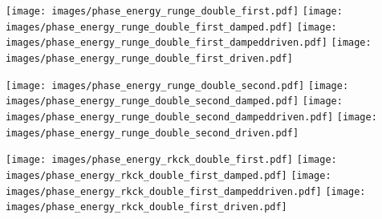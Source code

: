 \begin{multicols}{4}

{\centering\texttt{[image: images/phase\_energy\_runge\_double\_first.pdf]}}
\label{fig:64}
\hfill
{\centering\texttt{[image: images/phase\_energy\_runge\_double\_first\_damped.pdf]}}
\label{fig:65}
\hfill
{\centering\texttt{[image: images/phase\_energy\_runge\_double\_first\_dampeddriven.pdf]}}
\label{fig:66}
\hfill
{\centering\texttt{[image: images/phase\_energy\_runge\_double\_first\_driven.pdf]}}
\label{fig:67}
\hfill

\end{multicols}
\begin{multicols}{4}

{\centering\texttt{[image: images/phase\_energy\_runge\_double\_second.pdf]}}
\label{fig:68}
\hfill
{\centering\texttt{[image: images/phase\_energy\_runge\_double\_second\_damped.pdf]}}
\label{fig:69}
\hfill
{\centering\texttt{[image: images/phase\_energy\_runge\_double\_second\_dampeddriven.pdf]}}
\label{fig:70}
\hfill
{\centering\texttt{[image: images/phase\_energy\_runge\_double\_second\_driven.pdf]}}
\label{fig:71}
\hfill

\end{multicols}
\begin{multicols}{4}

{\centering\texttt{[image: images/phase\_energy\_rkck\_double\_first.pdf]}}
\label{fig:72}
\hfill
{\centering\texttt{[image: images/phase\_energy\_rkck\_double\_first\_damped.pdf]}}
\label{fig:73}
\hfill
{\centering\texttt{[image: images/phase\_energy\_rkck\_double\_first\_dampeddriven.pdf]}}
\label{fig:74}
\hfill
{\centering\texttt{[image: images/phase\_energy\_rkck\_double\_first\_driven.pdf]}}
\label{fig:75}
\hfill

\end{multicols}
